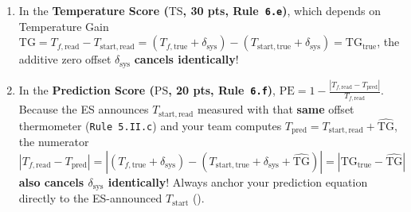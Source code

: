 \begin{itemize}
  \begin{enumerate}
    \item In the \textbf{Temperature Score ($\mathrm{TS}$, 30 pts, Rule~\texttt{6.e})}, which depends on Temperature Gain $\mathrm{TG} = T_{f,\mathrm{read}} - T_{\mathrm{start,read}} = (T_{f,\mathrm{true}} + \delta_{\mathrm{sys}}) - (T_{\mathrm{start,true}} + \delta_{\mathrm{sys}}) = \mathrm{TG}_{\mathrm{true}}$, the additive zero offset $\delta_{\mathrm{sys}}$ \textbf{cancels identically}!
    \item In the \textbf{Prediction Score ($\mathrm{PS}$, 20 pts, Rule~\texttt{6.f})}, $\mathrm{PE} = 1 - \frac{|T_{f,\mathrm{read}} - T_{\mathrm{pred}}|}{T_{f,\mathrm{read}}}$. Because the ES announces $T_{\mathrm{start,read}}$ measured with that \textbf{same} offset thermometer (\texttt{Rule 5.II.c}) and your team computes $T_{\mathrm{pred}} = T_{\mathrm{start,read}} + \widehat{\mathrm{TG}}$, the numerator $|T_{f,\mathrm{read}} - T_{\mathrm{pred}}| = |(T_{f,\mathrm{true}} + \delta_{\mathrm{sys}}) - (T_{\mathrm{start,true}} + \delta_{\mathrm{sys}} + \widehat{\mathrm{TG}})| = |\mathrm{TG}_{\mathrm{true}} - \widehat{\mathrm{TG}}|$ \textbf{also cancels $\delta_{\mathrm{sys}}$ identically}! Always anchor your prediction equation directly to the ES-announced $T_{\mathrm{start}}$ ().
  \end{enumerate}
\end{itemize}

